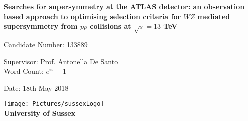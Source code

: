 \begin{titlepage}
\begin{center}

\vspace*{2cm} %
        
{\Large\textbf{Searches for supersymmetry at the ATLAS detector: an observation based approach to optimising selection criteria for $WZ$ mediated supersymmetry from $pp$ collisions at $\sqrt{s} = 13$ TeV}}
        
\vspace{1cm} %
      

{\large Candidate Number: 133889

Supervisor: Prof. Antonella De Santo\\
        
       
Word Count: $e^{i \pi} -1$\

Date: 18th May 2018\\
        
}

\vspace{6cm} %

\texttt{[image: Pictures/sussexLogo]}\\

{\Large\textbf{University of Sussex}}
\end{center}
\end{titlepage}














